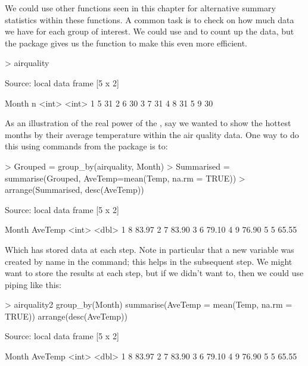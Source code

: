 We could use other functions seen in this chapter for alternative summary statistics within these functions. A common task is to check on how much data we have for each group of interest. We could use  and  to count up the data, but the  package gives us the  function to make this even more efficient. 
\begin{Schunk}
\begin{Sinput}
> airquality%>% count(Month) 
\end{Sinput}
\begin{Soutput}
Source: local data frame [5 x 2]

  Month     n
  <int> <int>
1     5    31
2     6    30
3     7    31
4     8    31
5     9    30
\end{Soutput}
\end{Schunk}
 
 
As an illustration of the real power of the , say we wanted to show the hottest months by their average temperature within the air quality data. One way to do this using commands from the  package is to: 
\begin{Schunk}
\begin{Sinput}
> Grouped = group_by(airquality, Month) 
> Summarised = summarise(Grouped, AveTemp=mean(Temp, na.rm = TRUE)) 
> arrange(Summarised, desc(AveTemp)) 
\end{Sinput}
\begin{Soutput}
Source: local data frame [5 x 2]

  Month AveTemp
  <int>   <dbl>
1     8   83.97
2     7   83.90
3     6   79.10
4     9   76.90
5     5   65.55
\end{Soutput}
\end{Schunk}
Which has stored data at each step. Note in particular that a new variable was created by name in the  command; this helps in the subsequent  step. We might want to store the results at each step, but if we didn't want to, then we could use piping like this: 
\begin{Schunk}
\begin{Sinput}
> airquality2 %>% 
   group_by(Month) %>% 
   summarise(AveTemp = mean(Temp, na.rm = TRUE))  %>% 
   arrange(desc(AveTemp)) 
\end{Sinput}
\begin{Soutput}
Source: local data frame [5 x 2]

  Month AveTemp
  <int>   <dbl>
1     8   83.97
2     7   83.90
3     6   79.10
4     9   76.90
5     5   65.55
\end{Soutput}
\end{Schunk}
 

